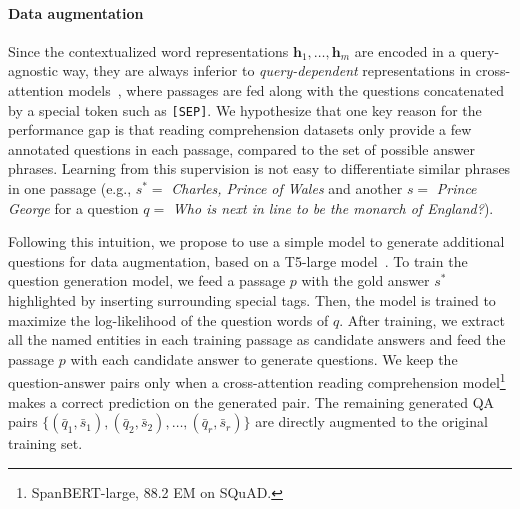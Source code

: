 \documentclass[11pt,a4paper]{article}
\newcommand\ti[1]{\textit{#1}}
\newcommand\ttt[1]{\texttt{#1}}
\newcommand\mf[1]{\mathbf{#1}}
\begin{document}
\paragraph{Data augmentation}
Since the contextualized word representations $\mf{h}_1, \dots, \mf{h}_m$ are encoded in a query-agnostic way, they are always inferior to \ti{query-dependent} representations in cross-attention models~\citep{devlin2019bert},  where passages are fed along with the questions concatenated by a special token such as \ttt{[SEP]}.
We hypothesize that one key reason for the performance gap is that reading comprehension datasets only provide a few annotated questions in each passage, compared to the set of possible answer phrases. Learning from this supervision is not easy to differentiate similar phrases in one passage (e.g., $s^*=$ \textit{Charles, Prince of Wales} and another $s=$ \textit{Prince George} for a question $q=$ \textit{Who is next in line to be the monarch of England?}).


\begin{comment}
Suppose that we are given a passage with the following question-answer pair in the training set:
\begin{quote}
\small
$p=$ \textit{Queen Elizabeth II is the sovereign, and her heir apparent is her eldest son, \textbf{Charles, Prince of Wales}. (...) Third in line is Prince George, the eldest child of the Duke of Cambridge (...)} \\
$q=$ \textit{who is next in line to be the monarch of england} \\
$s^*=$ \textit{\textbf{Charles, Prince of Wales}}
\end{quote}
\vspace{-0.5em}
\noindent While cross-attention models only need to represent the passage focusing on ``who is Queen Elizabeth II's heir apparent,'' our phrase encoder should take all the other phrases into account, (e.g., $s'=$ \textit{Prince George}), because their representations will be re-used for other questions (e.g., $q'=$ \textit{who is the eldest child of the duke of cambridge}).
\end{comment}

Following this intuition, we propose to use a simple model to generate additional questions for data augmentation, based on a T5-large model~\cite{raffel2020exploring}.
To train the question generation model, we feed a passage $p$ with the gold answer $s^*$ highlighted by inserting surrounding special tags.
Then, the model is trained to maximize the log-likelihood of the question words of $q$.
After training, we extract all the named entities in each training passage as candidate answers and feed the passage $p$ with each candidate answer to generate questions.
We keep the question-answer pairs only when a cross-attention reading comprehension model\footnote{SpanBERT-large, 88.2 EM on SQuAD.} makes a correct prediction on the generated pair.
The remaining generated QA pairs $\{(\bar{q}_1, \bar{s}_1), (\bar{q}_2, \bar{s}_2), \ldots, (\bar{q}_r, \bar{s}_{r})\}$ are directly augmented to the original training set.
\end{document}
